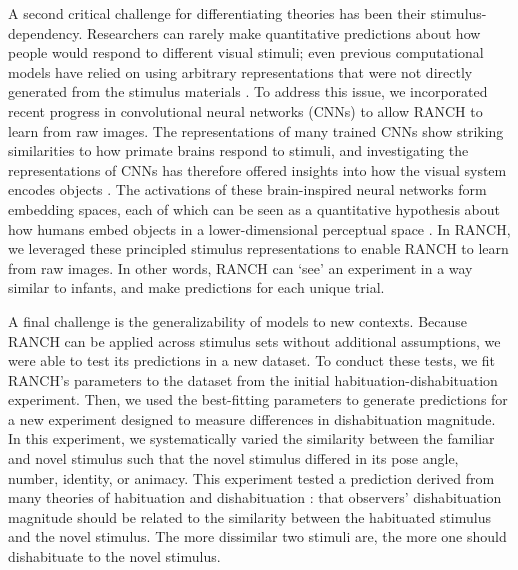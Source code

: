 \documentclass[
]{article}
\begin{document}
A second critical challenge for differentiating theories has been their stimulus-dependency. Researchers can rarely make quantitative predictions about how people would respond to different visual stimuli; even previous computational models have relied on using arbitrary representations that were not directly generated from the stimulus materials \autocites[e.g.~object location,][]{kidd2012goldilocks}[hand-specified binary feature vector,][]{cao2023habituation}. To address this issue, we incorporated recent progress in convolutional neural networks (CNNs) to allow RANCH to learn from raw images. The representations of many trained CNNs show striking similarities to how primate brains respond to stimuli, and investigating the representations of CNNs has therefore offered insights into how the visual system encodes objects \autocite{doshi2023cortical,hebart2020revealing,yamins2014performance}. The activations of these brain-inspired neural networks form embedding spaces, each of which can be seen as a quantitative hypothesis about how humans embed objects in a lower-dimensional perceptual space \autocite{schrimpf2020integrative}. In RANCH, we leveraged these principled stimulus representations to enable RANCH to learn from raw images. In other words, RANCH can `see' an experiment in a way similar to infants, and make predictions for each unique trial.

A final challenge is the generalizability of models to new contexts. Because RANCH can be applied across stimulus sets without additional assumptions, we were able to test its predictions in a new dataset. To conduct these tests, we  fit RANCH's parameters to the dataset from the initial habituation-dishabituation experiment. Then, we used the best-fitting parameters to generate predictions for a new experiment designed to measure differences in dishabituation magnitude. In this experiment, we systematically varied the similarity between the familiar and novel stimulus such that the novel stimulus differed in its pose angle, number,  identity, or animacy. This experiment tested a prediction derived from many theories of habituation and dishabituation \autocite{hunter1988multifactor,gershman2024habituation}: that observers' dishabituation magnitude should be related to the similarity between the habituated stimulus and the novel stimulus. The more dissimilar two stimuli are, the more one should dishabituate to the novel stimulus.
\end{document}
